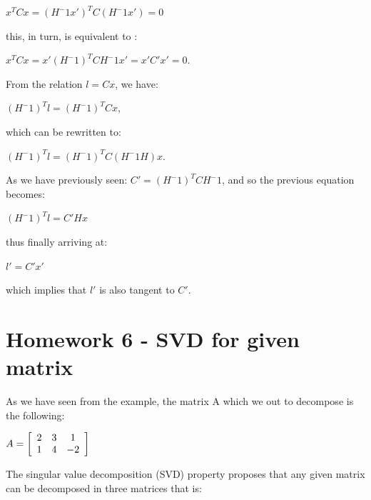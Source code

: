 \documentclass[]{article}
\begin{document}
\vspace{0.5em}

\centerline {
	$x^TCx = (H^-1x')^TC(H^-1x') = 0$
}
\vspace{0.5em}

this, in turn, is equivalent to :

\vspace{0.5em}

\centerline {
	$x^TCx = x'(H^-1)^TCH^-1x' = x'C'x' = 0$.
}

\vspace{0.5em}

From the relation $l = Cx$, we have:

\vspace{0.5em}

\centerline {
	$(H^-1)^Tl = (H^-1)^TCx$,
}

\vspace{0.5em}

which can be rewritten to:

\vspace{0.5em}

\centerline {	
	$(H^-1)^Tl = (H^-1)^TC(H^-1H)x$.
}

\vspace{0.5em}

As we have previously seen: $C' = (H^-1)^TCH^-1$, and so the previous equation becomes:

\centerline {
	$(H^-1)^Tl = C'Hx$
}

\vspace{0.5em}

thus finally arriving at:

\vspace{0.5em}

\centerline {
	$l' = C'x'$
}

which implies that $l'$ is also tangent to $C'$.

\section{Homework 6 - SVD for given matrix}
As we have seen from the example, the matrix A which we out to decompose is the following: 

\centerline{ $A = \left[ {\begin{array}{*{20}c}
		2 & 3 & 1 \\
		1 & 4 & -2   
		\end{array} } \right]$ }
	
The singular value decomposition (SVD) property proposes that any given matrix can be decomposed in three matrices that is:
\end{document}
